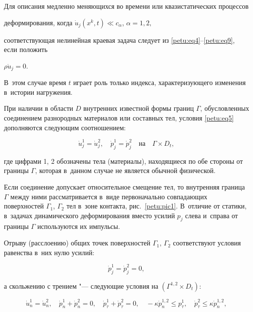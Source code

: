 Для описания медленно меняющихся во времени или квазистатических процессов

деформирования, когда $\dot {u}_j (x^k, t)\ll c_\alpha $, $\alpha =1, 2,$

соответствующая нелинейная краевая задача следует из \eqref{petu:eq4}--\eqref{petu:eq9}, если положить

$\rho \ddot {u}_j =0$. 

В~этом случае время $t$ играет роль только индекса, характеризующего изменения в~истории нагружения.



При наличии в области $D$ внутренних известной формы границ $\Gamma$, обусловленных соединением разнородных материалов или составных тел, условия \eqref{petu:eq5} дополняются следующим соотношением:

\begin{equation}

\label{petu:eq10}

\dot {u}_j^1 =\dot {u}_j^2 ,\quad \dot {p}_j^1 =\dot {p}_j^2 \quad \text{на} \quad \Gamma

\times D_t,

\end{equation}

где цифрами 1, 2 обозначены тела (материалы), находящиеся по обе стороны от границы $\Gamma$, которая в~данном случае не является обычной физической.

Если соединение допускает относительное смещение тел, то внутренняя граница $\Gamma $ между ними рассматривается в~виде первоначально совпадающих поверхностей $\Gamma _1 $, $\Gamma _2 $ тел в~зоне контакта, рис.~\ref{petu:pic1}. В~отличие от статики, в~задачах динамического деформирования вместо усилий $p_j$ слева и~справа от границы $\Gamma $ используются их импульсы.



Отрыву (расслоению) общих точек поверхностей $\Gamma _1$, $\Gamma_2$ соответствуют условия равенства в~них нулю усилий: 

$$\dot {p}_j^1 =\dot {p}_j^2 =0,$$ 

а скольжению с трением "--- следующие условия на $(\Gamma ^{1,2}\times D_t )$:

\begin{equation}

\label{petu:eq11}

\dot {u}_n^1 =\dot {u}_n^2,

\quad

\dot {p}_n^1 +\dot {p}_n^2 =0,

\quad

\dot {p}_\tau ^1 +\dot {p}_\tau ^2 =0,

\quad

-\kappa \dot {p}_n^{1,2} \le p_\tau ^1,\quad \dot {p}_\tau^2 \le

\kappa \dot {p}_n^{1,2},

\end{equation}

